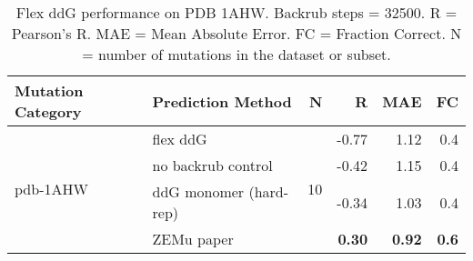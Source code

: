 \begin{table}
  \begin{tabular}{llrrrr}
\toprule
Mutation Category &       Prediction Method &   N &     R &  MAE &  FC \\
\midrule
 \multirow{ 4}{*}{pdb-1AHW} & flex ddG & \multirow{ 4}{*}{10} & -0.77 & 1.12 & 0.4  \\
 & no backrub control & & -0.42 & 1.15 & 0.4  \\
 & ddG monomer (hard-rep) & & -0.34 & 1.03 & 0.4  \\
 & ZEMu paper & & \textbf{0.30} & \textbf{0.92} & \textbf{0.6}  \\
\bottomrule
\end{tabular}
  \caption[Flex ddG performance on PDB 1AHW]{
    Flex ddG performance on PDB 1AHW. Backrub steps = 32500. R = Pearson's R. MAE = Mean Absolute Error. FC = Fraction Correct. N = number of mutations in the dataset or subset.
  } \label{tab:table-pdb-1AHW}
\end{table}
